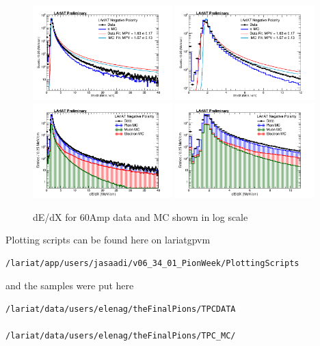 \begin{figure}[htb]
\centering
\includegraphics[width=0.48\textwidth]{Studies/Figures/dEdX_Fit_v2.png}
\includegraphics[width=0.48\textwidth]{Studies/Figures/dEdX_Fit_v3.png}
\includegraphics[width=0.48\textwidth]{Studies/Figures/dEdX_stacked_v2.png}
\includegraphics[width=0.48\textwidth]{Studies/Figures/dEdX_stacked_v3.png}
\caption[]{ dE/dX for 60Amp data and MC shown in log scale  } \label{fig:dEdXLogScale}
\end{figure}

Plotting scripts can be found here on lariatgpvm \begin{verbatim}
/lariat/app/users/jasaadi/v06_34_01_PionWeek/PlottingScripts
\end{verbatim} and the samples were put here \begin{verbatim}
/lariat/data/users/elenag/theFinalPions/TPCDATA

/lariat/data/users/elenag/theFinalPions/TPC_MC/
\end{verbatim}

